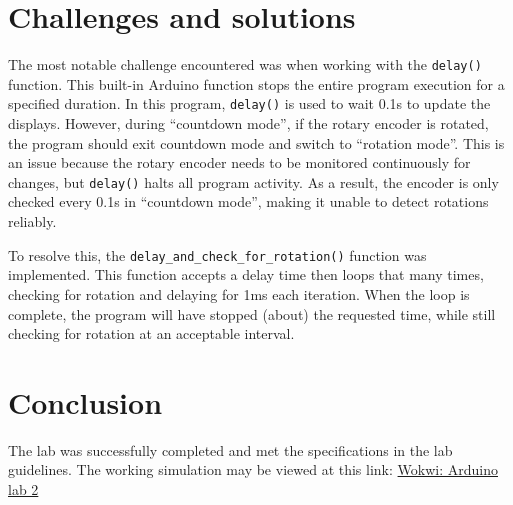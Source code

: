\documentclass[fleqn]{article}
\begin{document}
\section*{Challenges and solutions}
The most notable challenge encountered was when working with the \verb|delay()| function. This built-in Arduino function stops the entire program execution for a specified duration. In this program, \verb|delay()| is used to wait 0.1s to update the displays. However, during ``countdown mode'', if the rotary encoder is rotated, the program should exit countdown mode and switch to ``rotation mode''. This is an issue because the rotary encoder needs to be monitored continuously for changes, but \verb|delay()| halts all program activity. As a result, the encoder is only checked every 0.1s in ``countdown mode'', making it unable to detect rotations reliably. 

\vspace{0.15cm}
To resolve this, the \verb|delay_and_check_for_rotation()| function was implemented. This function accepts a delay time then loops that many times, checking for rotation and delaying for 1ms each iteration. When the loop is complete, the program will have stopped (about) the requested time, while still checking for rotation at an acceptable interval.

\section*{Conclusion}
The lab was successfully completed and met the specifications in the lab guidelines. The working simulation may be viewed at this link: \href{https://wokwi.com/projects/416744232255463425}{Wokwi: Arduino lab 2}
\end{document}

